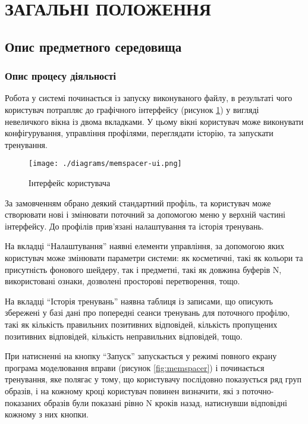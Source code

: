 \section{ЗАГАЛЬНІ ПОЛОЖЕННЯ}
\subsection{Опис предметного середовища}
\subsubsection{Опис процесу діяльності}

Робота у системі починається із запуску виконуваного файлу, в результаті чого користувач потрапляє до графічного інтерфейсу (рисунок \ref{fig:ui}) у вигляді невеличкого вікна із двома вкладками. У цьому вікні користувач може виконувати конфігурування, управління профілями, переглядати історію, та запускати тренування.

\begin{figure}[here]
  \centering\texttt{[image: ./diagrams/memspacer-ui.png]}
  \caption{Інтерфейс користувача}
  \label{fig:ui}
\end{figure}

За замовченням обрано деякий стандартний профіль, та користувач може створювати нові і змінювати поточний за допомогою меню у верхній частині інтерфейсу. До профілів прив'язані налаштування та історія тренувань.

На вкладці ``Налаштування'' наявні елементи управління, за допомогою яких користувач може змінювати параметри системи: як косметичні, такі як кольори та присутність фонового шейдеру, так і предметні, такі як довжина буферів N, використовані ознаки, дозволені просторові перетворення, тощо.

На вкладці ``Історія тренувань'' наявна таблиця із записами, що описують збережені у базі дані про попередні сеанси тренувань для поточного профілю, такі як кількість правильних позитивних відповідей, кількість пропущених позитивних відповідей, кількість неправильних відповідей, тощо.

При натисненні на кнопку ``Запуск'' запускається у режимі повного екрану програма моделювання вправи (рисунок \ref{fig:memspacer}) і починається тренування, яке полягає у тому, що користувачу послідовно показується ряд груп образів, і на кожному кроці користувач повинен визначити, які з поточно-показаних образів були показані рівно N кроків назад, натиснувши відповідні кожному з них кнопки.


